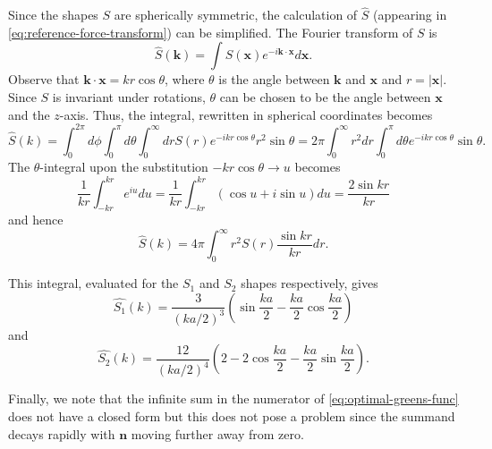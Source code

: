 Since the shapes $S$ are spherically symmetric, the calculation of $\hat{S}$ (appearing in \autoref{eq:reference-force-transform}) can be simplified.
The Fourier transform of $S$ is
\begin{equation*}
    \hat{S}(\mathbf{k}) = \int S(\mathbf{x}) e^{-i\mathbf{k} \cdot \mathbf{x}} d\mathbf{x}.
\end{equation*}
Observe that $\mathbf{k} \cdot \mathbf{x} = kr\cos\theta$, where $\theta$ is the angle between $\mathbf{k}$ and $\mathbf{x}$ and $r = |\mathbf{x}|$.
Since $S$ is invariant under rotations, $\theta$ can be chosen to be the angle between $\mathbf{x}$ and the $z$-axis.
Thus, the integral, rewritten in spherical coordinates becomes
\begin{equation*}
    \hat{S}(k) = \int_{0}^{2\pi}d\phi \int_{0}^{\pi} d\theta \int_{0}^{\infty}dr S(r)e^{-ikr\cos\theta}r^2\sin\theta
    = 2\pi \int_{0}^{\infty} r^2 dr \int_{0}^{\pi} d\theta e^{-ikr\cos\theta} \sin\theta.
\end{equation*}
The $\theta$-integral upon the substitution $-kr\cos\theta \to u$ becomes
\begin{equation*}
    \frac{1}{kr}\int_{-kr}^{kr} e^{iu} du
    = \frac{1}{kr} \int_{-kr}^{kr} (\cos u + i \sin u) du
    = \frac{2\sin kr}{kr}
\end{equation*}
and hence
\begin{equation*}
    \hat{S}(k) = 4\pi \int_{0}^{\infty} r^2 S(r)\frac{\sin kr}{kr}dr.
\end{equation*}

This integral, evaluated for the $S_1$ and $S_2$ shapes respectively, gives
\begin{equation*}
    \hat{S_1}(k) = \frac{3}{(ka/2)^3} \left(\sin\frac{ka}{2} - \frac{ka}{2} \cos\frac{ka}{2}\right)
\end{equation*}
and
\begin{equation*}
    \hat{S_2}(k) = \frac{12}{(ka/2)^4}\left(2 - 2\cos\frac{ka}{2}-\frac{ka}{2}\sin\frac{ka}{2}\right).
\end{equation*}

Finally, we note that the infinite sum in the numerator of \autoref{eq:optimal-greens-func} does not have a closed form but this does not pose a problem since the summand decays rapidly with $\mathbf{n}$ moving further away from zero.


